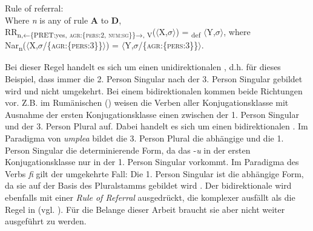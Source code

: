\begin{exe}
\begin{exe}
\ea%
    \label{ex:key:30}
Rule of referral:\\
Where \textit{n} is any of rule  \textbf{A} to \textbf{D},\\
RR\textsubscript{n,←\{PRET:yes, \textsc{agr:}\{\textsc{pers:}2, \textsc{num:sg}\}\}→, V}($\langle$X,$\sigma$$\rangle$) = \textsubscript{def} $\langle$Y,$\sigma$$\rangle$, where\\
Nar\textsubscript{n}($\langle$X,$\sigma $/\{\textsc{agr:}\{\textsc{pers:3}\}\}$\rangle$) = $\langle$Y,$\sigma $/\{\textsc{agr:}\{\textsc{pers:3}\}\}$\rangle$. \citep[218]{Stump2001}
    \z

Bei dieser Regel handelt es sich um einen unidirektionalen , d.h. für dieses Beispiel, dass immer die 2. Person Singular nach der 3. Person Singular gebildet wird und nicht umgekehrt. Bei einem bidirektionalen  kommen beide Richtungen vor. Z.B. im Rumänischen () weisen die Verben aller Konjugationsklasse mit Ausnahme der ersten Konjugationsklasse einen  zwischen der 1. Person Singular und der 3. Person Plural auf. Dabei handelt es sich um einen bidirektionalen . Im Paradigma von \textit{umplea} bildet die 3. Person Plural die abhängige und die 1. Person Singular die determinierende Form, da das  -\textit{u} in der ersten Konjugationsklasse nur in der 1. Person Singular vorkommt. Im Paradigma des Verbs \textit{fi} gilt der umgekehrte Fall: Die 1. Person Singular ist die abhängige Form, da sie auf der Basis des Pluralstamms gebildet wird \citep[213]{Stump2001}. Der bidirektionale  wird ebenfalls mit einer \textit{Rule of Referral} ausgedrückt, die komplexer ausfällt als die Regel in  (vgl. \citealt[219]{Stump2001}). Für die Belange dieser Arbeit braucht sie aber nicht weiter ausgeführt zu werden.



\end{exe}
\end{exe}
